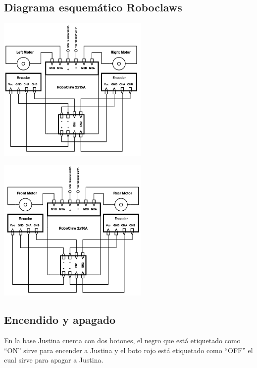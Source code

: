 \documentclass[a4paper,usenames,dvipsnames,svgnames,table]{book}
\begin{document}
\subsection{Diagrama esquemático Roboclaws}

\begin{center}
\includegraphics[width=0.55\textwidth]{Figures/Hardware/Esquematicos/Roboclaw_1.png}
\label{fig:Hardware:Partes:Diagrama:Esquematico:Roboclaw:1}
\end{center}

\begin{center}
\includegraphics[width=0.55\textwidth]{Figures/Hardware/Esquematicos/Roboclaw_2.png}
\label{fig:Hardware:Partes:Diagrama:Esquematico:Roboclaw:2}
\end{center}


\subsection{Encendido y apagado}

En la base Justina cuenta con dos botones, el negro que está etiquetado como ``ON'' sirve para encender a Justina y el boto
rojo está etiquetado como ``OFF'' el cual sirve para apagar a Justina.\\
\end{document}
